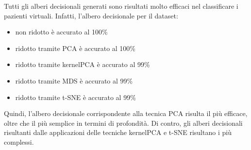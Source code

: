 \documentclass[11pt,a4paper,twocolumn]{article}
\begin{document}
Tutti gli alberi decisionali generati sono risultati molto efficaci nel classificare i pazienti virtuali. Infatti, l'albero decisionale per il dataset:
\begin{itemize}
	\item non ridotto è accurato al 100\%
	\item ridotto tramite PCA è accurato al 100\%
	\item ridotto tramite kernelPCA è accurato al 99\%
	\item ridotto tramite MDS è accurato al 99\%
	\item ridotto tramite t-SNE è accurato al 99\%
\end{itemize}
Quindi, l'albero decisionale corrispondente alla tecnica PCA risulta il più efficace, oltre che il più semplice in termini di profondità. Di contro, gli alberi decisionali risultanti dalle applicazioni delle tecniche kernelPCA e t-SNE risultano i più complessi.
\end{document}

